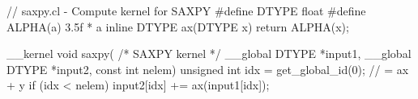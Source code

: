 // saxpy.cl - Compute kernel for SAXPY
#define DTYPE float
#define ALPHA(a) 3.5f * a
inline DTYPE ax(DTYPE x) { return ALPHA(x); }

__kernel void saxpy( /* SAXPY kernel */
    __global DTYPE *input1,
    __global DTYPE *input2,
    const int nelem)
{
     unsigned int idx = get_global_id(0);
     // = ax + y
     if (idx < nelem) {
         input2[idx] += ax(input1[idx]); }
}
